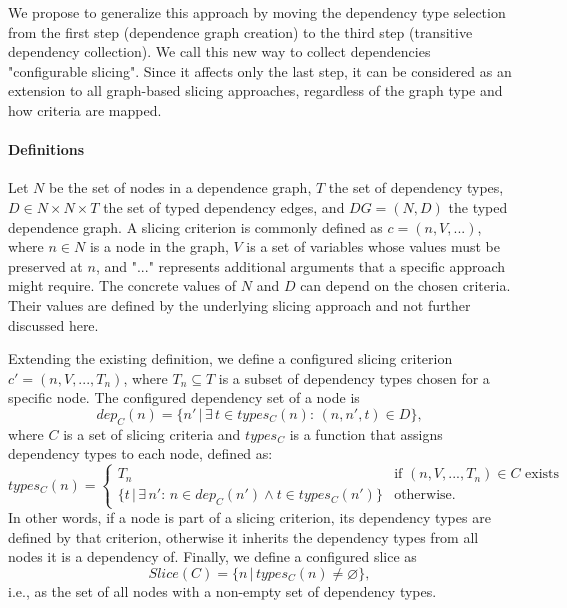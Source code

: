 \documentclass[
			english,
			]{elsarticle}
\begin{document}

We propose to generalize this approach by moving the dependency type selection from the first step (dependence graph creation) to the third step (transitive dependency collection).
We call this new way to collect dependencies "configurable slicing".
Since it affects only the last step, it can be considered as an extension to all graph-based slicing approaches, regardless of the graph type and how criteria are mapped.

\paragraph{Definitions} Let $N$ be the set of nodes in a dependence graph, $T$ the set of dependency types, $D \in N \times N \times T$ the set of typed dependency edges, and $DG = (N, D)$ the typed dependence graph. A slicing criterion is commonly defined as $c = (n, V, ...)$, where $n \in N$ is a node in the graph, $V$ is a set of variables whose values must be preserved at $n$, and "$...$" represents additional arguments that a specific approach might require.
The concrete values of $N$ and $D$ can depend on the chosen criteria.
Their values are defined by the underlying slicing approach and not further discussed here.

Extending the existing definition, we define a configured slicing criterion \linebreak $c' = (n, V, ..., T_n)$, where $T_n \subseteq T$ is a subset of dependency types chosen for a specific node.
The configured dependency set of a node is 
\[dep_C(n) = \{n'\, |\, \exists\, t \in types_C(n)\mbox{: } (n, n', t) \in D\},
\] 
where $C$ is a set of slicing criteria and $types_C$ is a function that assigns dependency types to each node, defined as:
	\[
	types_C(n) = \begin{cases} 
	T_n& \mbox{if } (n, V, ..., T_n) \in C \mbox{ exists}
	\\
	\{t \, |\, \exists\, n' \mbox{: } n \in dep_C(n') \wedge t \in types_C(n')\} & \mbox{otherwise.}
	\end{cases}
\]
In other words, if a node is part of a slicing criterion, its dependency types are defined by that criterion, otherwise it inherits the dependency types from all nodes it is a dependency of.
Finally, we define a configured slice as
\[Slice(C) = \{n\, |\, types_C(n) \neq \varnothing\},
\]
i.e., as the set of all nodes with a non-empty set of dependency types.
\end{document}
